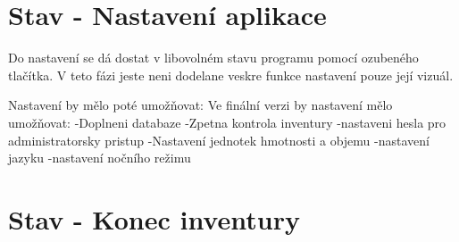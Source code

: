 


\section{Stav - Nastavení aplikace}
\label{sec:Nastavení aplikace}
Do nastavení se dá dostat v libovolném stavu programu pomocí ozubeného tlačítka. V teto fázi jeste neni dodelane veskre funkce nastavení pouze její vizuál.

Nastavení by mělo poté umožňovat:
Ve finální verzi by nastavení mělo umožňovat:
-Doplneni databaze
-Zpetna kontrola inventury
-nastaveni hesla pro administratorsky pristup
-Nastavení jednotek hmotnosti a objemu
-nastavení jazyku
-nastavení nočního režimu



\section{Stav - Konec inventury}



